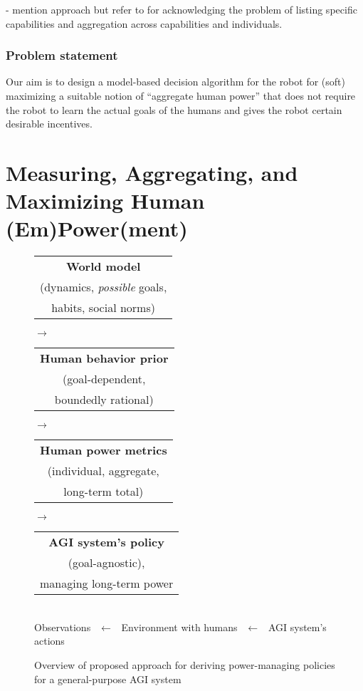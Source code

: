 \documentclass[letterpaper]{article} %
\begin{document}
- mention \cite{london2024beneficent} approach but refer to \cite{robeyns2006capability} for acknowledging the problem of listing specific capabilities and aggregation across capabilities and individuals.


\subsubsection{Problem statement}

Our aim is to design a model-based decision algorithm for the robot for (soft) maximizing a suitable notion of ``aggregate human power'' that does not require the robot to learn the actual goals of the humans and gives the robot certain desirable incentives.

\section{Measuring, Aggregating, and Maximizing Human (Em)Power(ment)}

\begin{figure*}
    \centering
    \begin{tabular}{c}
        \bf World model \\ (dynamics, {\em possible} goals, \\ habits, social norms)
    \end{tabular}
    $\to$ 
    \begin{tabular}{c}
        \bf Human behavior prior \\ (goal-dependent, \\ boundedly rational)
    \end{tabular}
    $\to$ 
    \begin{tabular}{c}
        \bf Human power metrics \\ (individual, aggregate, \\ long-term total)
    \end{tabular}
    $\to$ 
    \begin{tabular}{c}
        \bf AGI system's policy \\ (goal-agnostic), \\ managing long-term power
    \end{tabular} \\[1mm]
    \raisebox{1.5ex}{$\nwarrow~~$}
    Observations 
    $~~\gets~~$
    Environment with humans
    $~~\gets~~$
    AGI system's actions
    \raisebox{1.5ex}{$~~\swarrow$}
    \caption{Overview of proposed approach for deriving power-managing policies for a general-purpose AGI system}
    \label{fig:enter-label}
\end{figure*}
\end{document}
